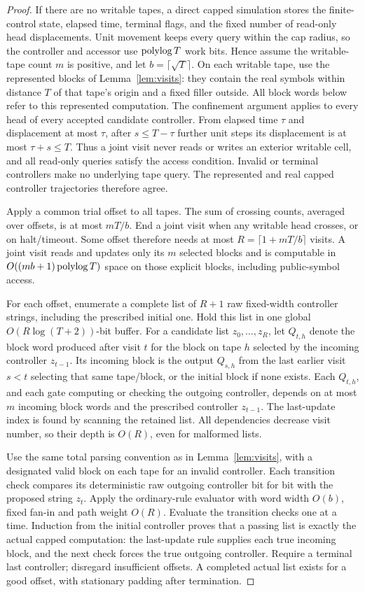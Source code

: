\begin{proof}
If there are no writable tapes, a direct capped simulation stores the
finite-control state, elapsed time, terminal flags, and the fixed number
of read-only head displacements. Unit movement keeps every query within
the cap radius, so the controller and accessor use \(\operatorname{polylog} T\) work bits.
Hence assume the writable-tape count \(m\) is positive, and let
\(b=\lceil\sqrt T\rceil\). On each writable tape, use the represented
blocks of Lemma~\ref{lem:visits}: they contain the real symbols within
distance \(T\) of that tape's origin and a fixed filler outside.
All block words below refer to this represented computation.
The confinement argument applies to every head of every accepted
candidate controller. From elapsed time \(\tau\) and displacement at
most \(\tau\), after \(s\le T-\tau\) further unit steps its displacement
is at most \(\tau+s\le T\). Thus a joint visit never reads or writes an
exterior writable cell, and all read-only queries satisfy the access
condition. Invalid or terminal controllers make no underlying tape query.
The represented and real capped controller trajectories therefore agree.

Apply a common trial offset to all tapes.
The sum of crossing counts, averaged over offsets, is at most
\(mT/b\). End a joint visit when any writable head crosses, or on
halt/timeout. Some offset therefore needs at most
\(R=\lceil1+mT/b\rceil\) visits. A joint visit reads and updates
only its \(m\) selected blocks and is computable in
\(O((mb+1)\operatorname{polylog} T)\) space on those explicit blocks, including
public-symbol access.

For each offset, enumerate a complete list of \(R+1\) raw fixed-width
controller strings, including the prescribed initial one. Hold this list
in one global \(O(R\log(T+2))\)-bit buffer.
For a candidate list \(z_0,\ldots,z_R\), let \(Q_{t,h}\) denote
the block word produced after visit \(t\) for the block on tape \(h\) selected
by the incoming controller \(z_{t-1}\).
Its incoming block is the output \(Q_{s,h}\) from the last earlier
visit \(s<t\) selecting that same tape/block, or the initial block
if none exists. Each \(Q_{t,h}\), and each gate computing or checking
the outgoing controller, depends on at most \(m\) incoming block
words and the prescribed controller \(z_{t-1}\).
The last-update index is found by scanning the retained list.
All dependencies decrease visit number, so their depth is \(O(R)\),
even for malformed lists.

Use the same total parsing convention as in Lemma~\ref{lem:visits},
with a designated valid block on each tape for an invalid controller.
Each transition check compares its deterministic raw outgoing controller
bit for bit with the proposed string \(z_t\).
Apply the ordinary-rule evaluator with word width \(O(b)\), fixed
fan-in and path weight \(O(R)\).
Evaluate the transition checks one at a time. Induction from the
initial controller proves that a passing list is exactly the actual
capped computation: the last-update rule supplies each true
incoming block, and the next check forces the true outgoing
controller. Require a terminal last controller; disregard
insufficient offsets. A completed actual list exists for a good
offset, with stationary padding after termination.


\end{proof}
